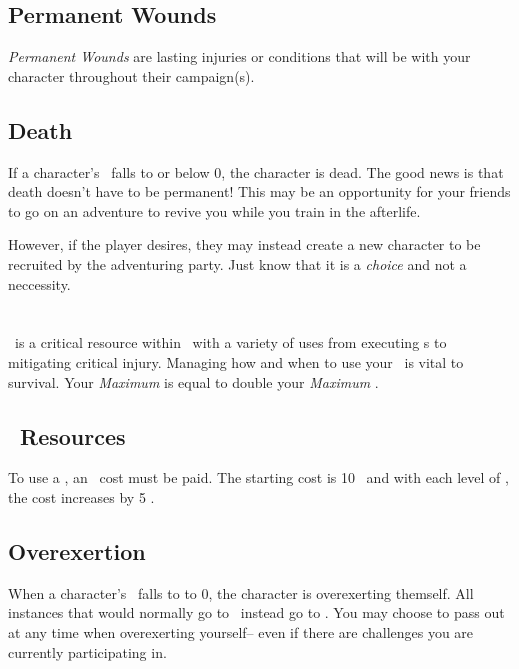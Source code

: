 \subsection{Permanent Wounds}\label{subsec:wounds}
\emph{Permanent Wounds} are lasting injuries or conditions that will be with your character throughout their campaign(s).

\subsection{Death}\label{subsec:death}
If a character's \HPful\ falls to or below 0, the character is dead. The good news is that death doesn't have to be permanent!
This may be an opportunity for your friends to go on an adventure to revive you while you train in the afterlife.

However, if the player desires, they may instead create a new character
to be recruited by the adventuring party. Just know that it is a \emph{choice}
and not a neccessity.

\section{\ENful\index{\ENful}}\label{sec:energy}
\ENful\ is a critical resource within \gametitlemini\ with a variety of uses from executing \techn s to mitigating critical injury.
Managing how and when to use your \ENful\ is vital to survival. Your \emph{Maximum \ENful} is equal to double your \emph{Maximum \HPful}.

\subsection{\techn\ Resources}\index{\techn}\label{subsec:tech_resources}
To use a \techn{}, an \ENful\ cost must be paid. The starting cost is 10 \EN\ and with each level of \advancement{}\index{\advancement}, the cost increases by 5 \EN.

\subsection{Overexertion}\label{subsec:exhaustion}
When a character's \ENful\ falls to to 0, the character is overexerting themself. All instances that would normally go to \ENful\ instead go to \HPful . You may choose to pass out at any time when overexerting yourself-- even if there are challenges you are currently participating in.

